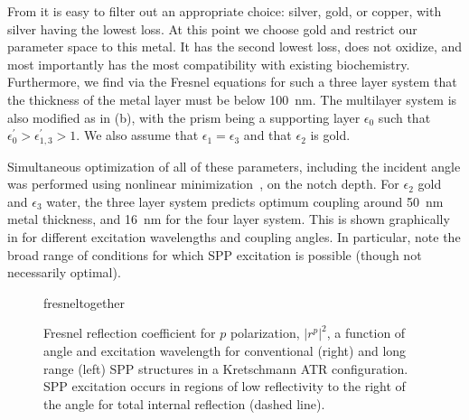 From  it is easy to filter out an appropriate
choice: silver, gold, or copper, with silver having the lowest loss.  At
this point we choose gold and restrict our parameter space to this metal.
It has the second lowest loss, does not oxidize, and most importantly has
the most compatibility with existing biochemistry.  Furthermore, we find
via the Fresnel equations for such a three layer system that the thickness
of the metal layer must be below \SI{100}{\nano\meter}.  The multilayer
system is also modified as in (b), with the
prism being a supporting layer $\epsilon_0$ such that
$\epsilon^\prime_0>\epsilon^\prime_{1,3}>1$.  We also assume that
$\epsilon_1=\epsilon_3$ and that $\epsilon_2$ is gold.

Simultaneous optimization of all of these parameters, including the
incident angle was performed using nonlinear
minimization~\cite{brent1973algorithms}, on the notch depth.  For
$\epsilon_2$ gold and $\epsilon_3$ water, the three layer system predicts
optimum coupling around \SI{50}{\nano\meter} metal thickness, and
\SI{16}{\nano\meter} for the four layer system.  This is shown graphically
in  for different excitation wavelengths and
coupling angles.  In particular, note the broad range of conditions for
which SPP excitation is possible (though not necessarily optimal).

\begin{figure}[ht]
\centering
{fresneltogether}
\caption{Fresnel reflection coefficient for $p$ polarization, $|r^p|^2$, a
function of angle and excitation wavelength for conventional (right) and
long range (left) SPP structures in a Kretschmann ATR configuration.  SPP
excitation occurs in regions of low reflectivity to the right of the angle
for total internal reflection (dashed line).}
\label{fig:fresnelangle}
\end{figure}

